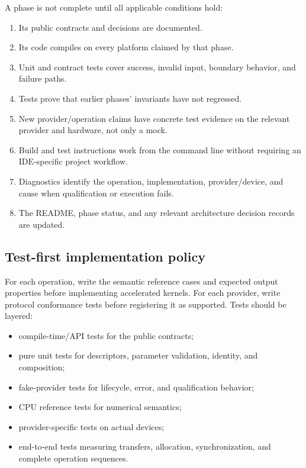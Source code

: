 A phase is not complete until all applicable conditions hold:
\begin{enumerate}
  \item Its public contracts and decisions are documented.
  \item Its code compiles on every platform claimed by that phase.
  \item Unit and contract tests cover success, invalid input, boundary behavior, and failure paths.
  \item Tests prove that earlier phases' invariants have not regressed.
  \item New provider/operation claims have concrete test evidence on the relevant provider and hardware, not only a mock.
  \item Build and test instructions work from the command line without requiring an IDE-specific project workflow.
  \item Diagnostics identify the operation, implementation, provider/device, and cause when qualification or execution fails.
  \item The README, phase status, and any relevant architecture decision records are updated.
\end{enumerate}

\subsection{Test-first implementation policy}

For each operation, write the semantic reference cases and expected output properties before implementing accelerated kernels. For each provider, write protocol conformance tests before registering it as supported. Tests should be layered:
\begin{itemize}
  \item compile-time/API tests for the public contracts;
  \item pure unit tests for descriptors, parameter validation, identity, and composition;
  \item fake-provider tests for lifecycle, error, and qualification behavior;
  \item CPU reference tests for numerical semantics;
  \item provider-specific tests on actual devices;
  \item end-to-end tests measuring transfers, allocation, synchronization, and complete operation sequences.
\end{itemize}

